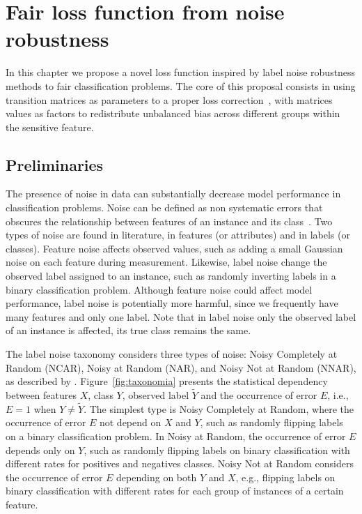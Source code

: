 \chapter{Fair loss function from noise robustness}\label{chap:ftl}

In this chapter we propose a novel loss function inspired by label noise robustness methods to fair classification problems. The core of this proposal consists in using transition matrices as parameters to a proper loss correction~\citep{Patrini2017}, with matrices values as factors to redistribute unbalanced bias across different groups within the sensitive feature.

\section{Preliminaries} \label{sec:ftl_preliminaries}

The presence of noise in data can substantially decrease model performance in classification problems. Noise can be defined as non systematic errors that obscures the relationship between features of an instance and its class~\citep{Frenay2014,Hickey1996,Quinlan1986}. Two types of noise are found in literature, in features (or attributes) and in labels (or classes). Feature noise affects observed values, such as adding a small Gaussian noise on each feature during measurement. Likewise, label noise change the observed label assigned to an instance, such as randomly inverting labels in a binary classification problem. Although feature noise could affect model performance, label noise is potentially more harmful, since we frequently have many features and only one label. Note that in label noise only the observed label of an instance is affected, its true class remains the same.

The label noise taxonomy considers three types of noise: Noisy Completely at Random (NCAR), Noisy at Random (NAR), and Noisy Not at Random (NNAR), as described by \cite{Frenay2014}. Figure~\ref{fig:taxonomia} presents the statistical dependency between features $X$, class $Y$, observed label $\tilde{Y}$ and the occurrence of error $E$, i.e., $E=1$ when $Y \neq \tilde{Y}$. The simplest type is Noisy Completely at Random, where the occurrence of error $E$ not depend on $X$ and $Y$, such as randomly flipping labels on a binary classification problem. In Noisy at Random, the occurrence of error $E$ depends only on $Y$, such as randomly flipping labels on binary classification with different rates for positives and negatives classes. Noisy Not at Random considers the occurrence of error $E$ depending on both $Y$ and $X$, e.g., flipping labels on binary classification with different rates for each group of instances of a certain feature.

